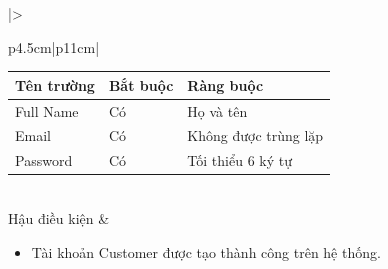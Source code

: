 \documentclass[12pt,a4paper]{report}
\begin{document}
\begin{longtable}{|>{\raggedright\arraybackslash\bfseries}p{4.5cm}|p{11cm}|}
\begin{tabular}{|p{3.5cm}|p{2.5cm}|p{4cm}|}
\hline
\textbf{Tên trường} & \textbf{Bắt buộc} & \textbf{Ràng buộc} \\ \hline
Full Name & Có & Họ và tên \\ \hline
Email & Có & Không được trùng lặp \\ \hline
Password & Có & Tối thiểu 6 ký tự \\ \hline
\end{tabular} \\ \hline
Hậu điều kiện & 
\begin{itemize}[leftmargin=*, nosep, topsep=0pt, partopsep=0pt]
    \item Tài khoản Customer được tạo thành công trên hệ thống.
\end{itemize} \\ \hline
\end{longtable}

\vspace{0.5cm}
\end{document}

